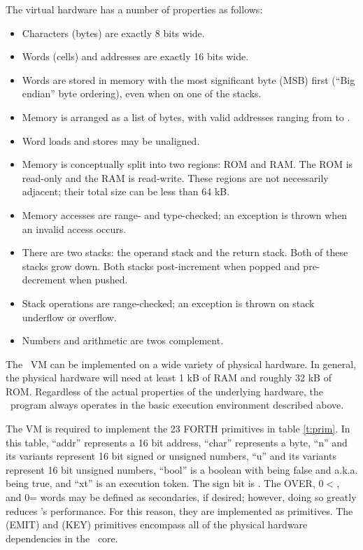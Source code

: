 \documentclass{article}
\begin{document}
\noindent
The virtual hardware has a number of properties as follows:
\begin{itemize}
\item Characters (bytes) are exactly 8 bits wide.
\item Words (cells) and addresses are exactly 16 bits wide.
\item Words are stored in memory with the most significant byte
  (MSB) first (``Big endian'' byte ordering), even when on one of
  the stacks.
\item Memory is arranged as a list of bytes, with valid addresses
  ranging from  to .
\item Word loads and stores may be unaligned.
\item Memory is conceptually split into two regions: ROM and
  RAM. The ROM is read-only and the RAM is read-write. These regions
  are not necessarily adjacent; their total size can be less than 64
  kB.
\item Memory accesses are range- and type-checked; an exception
  is thrown when an invalid access occurs.
\item There are two stacks: the operand stack and the return
  stack. Both of these stacks grow down. Both stacks post-increment
  when popped and pre-decrement when pushed.
\item Stack operations are range-checked; an exception is thrown
  on stack underflow or overflow.
\item Numbers and arithmetic are twos complement.
\end{itemize}
The \M\ VM can be implemented on a wide variety of physical
hardware. In general, the physical hardware will need at least 1 kB
of RAM and roughly 32 kB of ROM. Regardless of the actual properties
of the underlying hardware, the \M\ program always operates in the
basic execution environment described above.

The \M VM is required to implement the 23 FORTH primitives in table
\ref{t:prim}. In this table, ``addr'' represents a 16 bit address,
``char'' represents a byte, ``n'' and its variants represent 16 bit
signed or unsigned numbers, ``u'' and its variants represent 16 bit
unsigned numbers, ``bool'' is a boolean with  being false and
 a.k.a.  being true, and ``xt'' is an execution
token. The sign bit is . The OVER, 0$<$, and 0= words may be
defined as secondaries, if desired; however, doing so greatly reduces
\M's performance. For this reason, they are implemented as
primitives. The (EMIT) and (KEY) primitives encompass all of the
physical hardware dependencies in the \M\ core.
\end{document}
